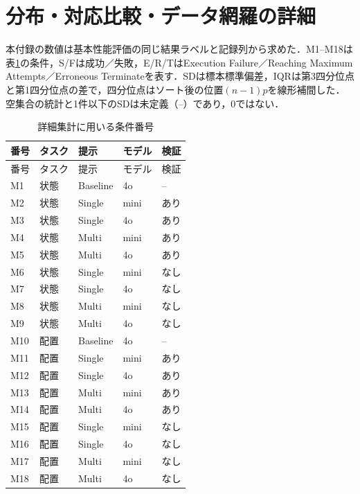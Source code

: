 \onecolumn
\section{分布・対応比較・データ網羅の詳細}\label{app:statistics}
本付録の数値は基本性能評価の同じ結果ラベルと記録列から求めた．M1--M18は表\ref{tab:method_dictionary}の条件，S/Fは成功／失敗，E/R/TはExecution Failure／Reaching Maximum Attempts／Erroneous Terminateを表す．SDは標本標準偏差，IQRは第3四分位点と第1四分位点の差で，四分位点はソート後の位置$(n-1)p$を線形補間した．空集合の統計と1件以下のSDは未定義（--）であり，0ではない．

{\scriptsize\setlength{\tabcolsep}{3pt}
\begin{longtable}{lllll}
\caption{詳細集計に用いる条件番号}\label{tab:method_dictionary}\\
\hline
番号 & タスク & 提示 & モデル & 検証\\\hline\endfirsthead
番号 & タスク & 提示 & モデル & 検証\\\hline\endhead
\hline\endfoot
M1 & 状態 & Baseline & 4o & -- \\
M2 & 状態 & Single & mini & あり \\
M3 & 状態 & Single & 4o & あり \\
M4 & 状態 & Multi & mini & あり \\
M5 & 状態 & Multi & 4o & あり \\
M6 & 状態 & Single & mini & なし \\
M7 & 状態 & Single & 4o & なし \\
M8 & 状態 & Multi & mini & なし \\
M9 & 状態 & Multi & 4o & なし \\
M10 & 配置 & Baseline & 4o & -- \\
M11 & 配置 & Single & mini & あり \\
M12 & 配置 & Single & 4o & あり \\
M13 & 配置 & Multi & mini & あり \\
M14 & 配置 & Multi & 4o & あり \\
M15 & 配置 & Single & mini & なし \\
M16 & 配置 & Single & 4o & なし \\
M17 & 配置 & Multi & mini & なし \\
M18 & 配置 & Multi & 4o & なし \\
\end{longtable}}

